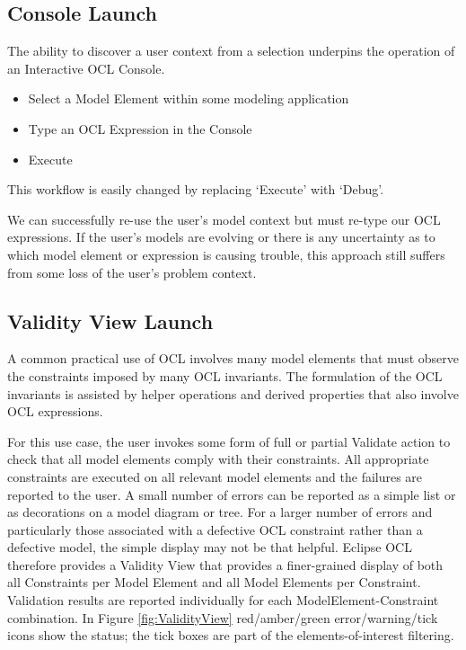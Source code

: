 \documentclass[a4paper]{article}
\begin{document}
\subsection{Console Launch}\label{ConsoleLaunch}

The ability to discover a user context from a selection underpins the operation of an Interactive OCL Console.

\begin{itemize}
\item Select a Model Element within some modeling application
\item Type an OCL Expression in the Console
\item Execute
\end{itemize}

This workflow is easily changed by replacing `Execute' with `Debug'.

We can successfully re-use the user's model context but must re-type our OCL expressions. If the user's models are evolving or there is any uncertainty as to which model element or expression is causing trouble, this approach still suffers from some loss of the user's problem context.

\subsection{Validity View Launch}\label{ValidityViewLaunch}

A common practical use of OCL involves many model elements that must observe the constraints imposed by many OCL invariants. The formulation of the OCL invariants is assisted by helper operations and derived properties that also involve OCL expressions.

For this use case, the user invokes some form of full or partial Validate action to check that all model elements comply with their constraints. All appropriate constraints are executed on all relevant model elements and the failures are reported to the user. A small number of errors can be reported as a simple list or as decorations on a model diagram or tree. For a larger number of errors and particularly those associated with a defective OCL constraint rather than a defective model, the simple display may not be that helpful. Eclipse OCL therefore provides a Validity View that provides a finer-grained display of both all Constraints per Model Element and all Model Elements per Constraint. Validation results are reported individually for each ModelElement-Constraint combination. In Figure \ref{fig:ValidityView} red/amber/green error/warning/tick icons show the status; the tick boxes are part of the elements-of-interest filtering.
\end{document}
